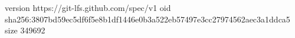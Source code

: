 version https://git-lfs.github.com/spec/v1
oid sha256:3807bd59ec5df6f5e8b1df1446e0b3a522eb57497e3cc27974562aec3a1ddca5
size 349692
